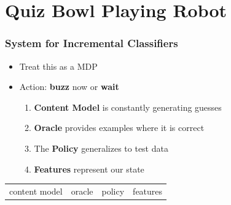 \section{Quiz Bowl Playing Robot}

\begin{frame}
	\frametitle{System for Incremental Classifiers}

	\begin{itemize}
		\item Treat this as a MDP
		\item Action: {\bf buzz} now or {\bf wait}
                     \pause
                    \begin{enumerate}
                  \item {\bf Content Model} is constantly generating guesses
                     \item {\bf Oracle} provides examples where it is correct
                   \item The {\bf Policy} generalizes to test data
                       \item {\bf Features} represent our state
                    \end{enumerate}
	\end{itemize}
\begin{block}{}
  \begin{center}
    \vspace{-.5cm}
    \begin{tabular}{cccc}
      \alert<3->{content model} & oracle & policy & features \\
    \end{tabular}
    \vspace{-.5cm}
  \end{center}
\end{block}
\end{frame}


